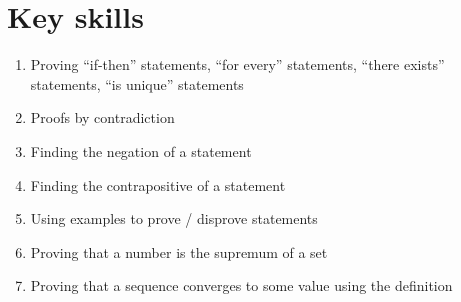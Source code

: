 \documentclass[12pt]{amsart}
\newcommand{\e}{\varepsilon}
\renewcommand{\d}{\delta}
\begin{document}
\section*{Key skills}

\begin{enumerate}
	\item Proving ``if-then'' statements, ``for every'' statements, ``there exists'' statements, ``is unique'' statements
	\item Proofs by contradiction
	\item Finding the negation of a statement
	\item Finding the contrapositive of a statement
	\item Using examples to prove / disprove statements
		
	\item Proving that a number is the supremum of a set

	\item Proving that a sequence converges to some value using the definition
	\begin{comment}
		\item Algebra with limits of sequences: using these to determine if a sequence converges, and to what

	\item Using squeeze theorem to show sequences converge


	\item Relationship between boundedness, convergence, and monotonicity
					\item Proofs by induction
	

	\item Relationship between convergence/boundedness of sequences and convergence of subsequences


	\item Using the $\e-\d$ definition to compute limits
					
	\item Using algebra/squeeze theorem to compute limits
	
	\item Using the $\e-\d$ definition to show continuity

	\item Using algebra/compositions to show continuity
	\item Applying the $\e-\d$ definitions of limits and continuity
					\item Applying the Intermediate Value Theorem
		\item Applying Boundedness and Extreme Value Theorems
		


\end{comment}
\end{enumerate}
\end{document}
